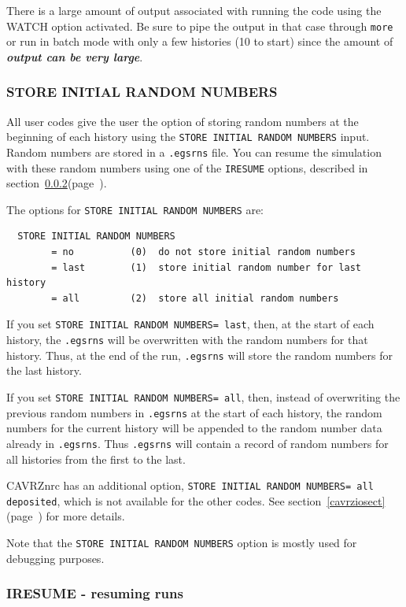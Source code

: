 \documentclass[12pt,twoside]{article}  %
\newcommand{\lpage}[1]{(page~\pageref{#1})}
\begin{document}
There is a large amount of output associated with running the code
using the WATCH option activated. Be sure to pipe the output
in that case through \verb+more+ or run in batch mode with only a few
histories (10 to start) since the amount of {\bfseries {\em output can be
very large}}.

\subsubsection{STORE INITIAL RANDOM NUMBERS}
\label{rnssect}
All user codes give the user the option of storing random
numbers at the beginning of each history using
the {\tt STORE INITIAL RANDOM NUMBERS} input.  Random numbers are stored
in a {\tt .egsrns} file.  You can resume the simulation
with these random numbers using one of the {\tt IRESUME} options,
described in section~\ref{resumesect}\lpage{resumesect}.

The options for {\tt STORE INITIAL RANDOM NUMBERS} are:

\begin{verbatim}
  STORE INITIAL RANDOM NUMBERS
        = no          (0)  do not store initial random numbers
        = last        (1)  store initial random number for last history
        = all         (2)  store all initial random numbers
\end{verbatim}

If you set {\tt STORE INITIAL RANDOM NUMBERS= last}, then, at the start
of each history, the {\tt .egsrns} will be overwritten with the random
numbers for that history.  Thus, at the end of the run, {\tt .egsrns}
will store the random numbers for the last history.

If you set {\tt STORE INITIAL RANDOM NUMBERS= all}, then, instead of
overwriting the previous random numbers in {\tt .egsrns} at the start of
each history, the random numbers for the current history will be appended
to the random number data already in {\tt .egsrns}.  Thus {\tt .egsrns} will
contain a record of random numbers for all histories from the first to
the last.

CAVRZnrc has an additional option,
{\tt STORE INITIAL RANDOM NUMBERS= all deposited},
which is not available for the other codes.  See
section~\ref{cavrziosect}\lpage{cavrziosect} for more details.

Note that the {\tt STORE INITIAL RANDOM NUMBERS} option is mostly used for
debugging purposes.

\subsubsection{IRESUME - resuming runs}
\label{resumesect}
\end{document}
